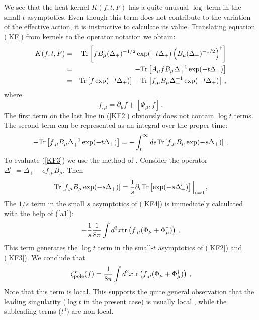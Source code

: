 \documentclass[a4paper,12pt]{article}
\begin{document}
We see that the heat kernel $K(f,t,F)$ has a quite
unusual $\log$-term in the small $t$ asymptotics.
Even though this term does not contribute to
the variation of the effective action, it is
instructive to calculate its value. Translating
equation (\ref{KF}) from kernels to the operator
notation we obtain:
\begin{eqnarray}
K(f,t,F)&=&{\rm Tr} \left[ f B_\mu (\Delta_+)^{-1/2}
\exp (-t\Delta_+) \left( B_\mu (\Delta_+)^{-1/2}\right)^\dag
\right] \nonumber \\
&=&-{\rm Tr} \left[ A_\mu f B_\mu
\Delta_+^{-1} \exp (-t\Delta_+)\right] \nonumber \\
&=&{\rm Tr} \left[ f\exp (-t\Delta_+) \right]
-{\rm Tr} \left[ f_{,\mu} B_\mu \Delta_+^{-1} 
\exp (-t\Delta_+)\right] \,, \label{KF2}
\end{eqnarray}
where
\begin{equation}
f_{,\mu}=\partial_\mu f + [\Phi_\mu ,f] \,. \label{fmu}
\end{equation}
The first term on the last line in (\ref{KF2}) obviously
does not contain $\log t$ terms. The second term can be
represented as an integral over the proper time:
\begin{equation}
-{\rm Tr} \left[ f_{,\mu} B_\mu \Delta_+^{-1} 
\exp (-t\Delta_+)\right] = -\int_t^\infty ds
{\rm Tr} \left[ f_{,\mu} B_\mu 
\exp (-s\Delta_+)\right] \,,\label{KF3}
\end{equation}
To evaluate (\ref{KF3}) we use the method of \cite{bgv97}.
Consider the operator $\Delta_+^\epsilon =\Delta_+ -\epsilon
f_{,\mu}B_\mu$. Then
\begin{equation}
{\rm Tr} \left[ f_{,\mu} B_\mu 
\exp (-s\Delta_+)\right] = \frac 1s 
\partial_\epsilon  
{\rm Tr} \left[ \exp (-s\Delta_+^\epsilon )\right]\Big|_{\epsilon =0} \,,
\label{KF4}
\end{equation}
The $1/s$ term in the small $s$ asymptotics of (\ref{KF4})
is immediately calculated with the help of (\ref{a1}):
\begin{equation}
-\frac 1s \frac 1{8\pi} \int d^2x 
{\rm tr}\left( f_{,\mu}(\Phi_{\mu}+\Phi_\mu^\dag )\right)\,,
\label{1s}
\end{equation}
This term generates the $\log t$ term in the small-$t$
asymptotics of (\ref{KF2}) and (\ref{KF3}). We conclude that
\begin{equation}
\zeta^F_{\mbox{\scriptsize pole}}(f)= \frac 1{8\pi} \int d^2x 
{\rm tr}\left( f_{,\mu}(\Phi_{\mu}+\Phi_\mu^\dag )\right)\,,
\label{logt}
\end{equation}
Note that this term is local. This supports the quite
general observation that the leading singularity 
($\log t$ in the present case) is usually local , while
the subleading terms ($t^0$) are non-local.
\end{document}
